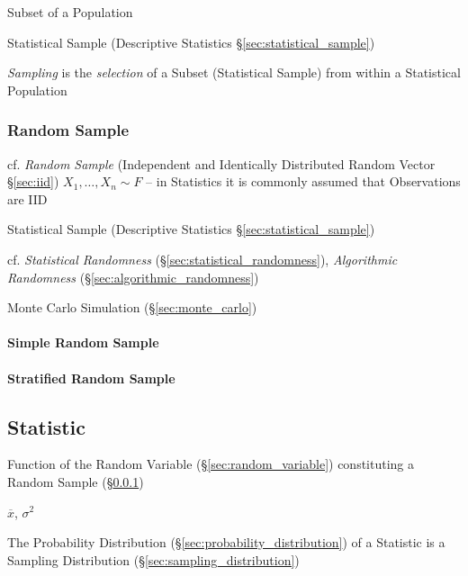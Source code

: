 Subset of a Population

Statistical Sample (Descriptive Statistics \S\ref{sec:statistical_sample})

\emph{Sampling} is the \emph{selection} of a Subset (Statistical Sample) from
within a Statistical Population



\subsubsection{Random Sample}\label{sec:random_sample}

\fist cf. \emph{Random Sample} (Independent and Identically Distributed Random
Vector \S\ref{sec:iid}) $X_1, \ldots, X_n \sim F$ -- in Statistics it is
commonly assumed that Observations are IID

Statistical Sample (Descriptive Statistics \S\ref{sec:statistical_sample})

cf. \emph{Statistical Randomness} (\S\ref{sec:statistical_randomness}),
\emph{Algorithmic Randomness} (\S\ref{sec:algorithmic_randomness})

\fist Monte Carlo Simulation (\S\ref{sec:monte_carlo})



\paragraph{Simple Random Sample}\label{sec:simple_random_sample}\hfill

\paragraph{Stratified Random Sample}\label{sec:stratified_random_sample}\hfill



\subsection{Statistic}\label{sec:statistic}

Function of the Random Variable (\S\ref{sec:random_variable}) constituting a
Random Sample (\S\ref{sec:random_sample})

$\overline{x}$, $\sigma^2$

The Probability Distribution (\S\ref{sec:probability_distribution}) of
a Statistic is a Sampling Distribution
(\S\ref{sec:sampling_distribution})

